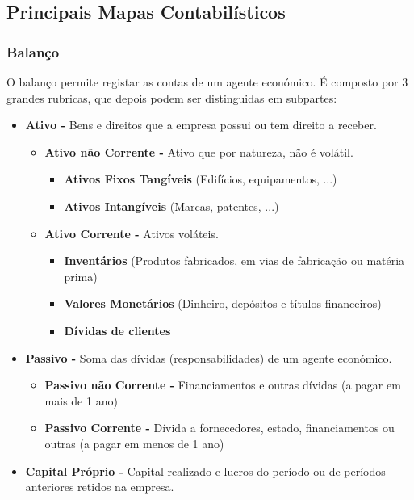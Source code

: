\documentclass[11pt]{article}
\begin{document}
\subsection{Principais Mapas Contabilísticos}

\subsubsection{Balanço}

O balanço permite registar as contas de um agente económico. É composto por 3 grandes rubricas, que depois podem ser distinguidas em subpartes:

\begin{itemize}
    \item \textbf{Ativo -} Bens e direitos que a empresa possui ou tem direito a receber.
    \begin{itemize}
        \item \textbf{Ativo não Corrente -} Ativo que por natureza, não é volátil.
        \begin{itemize}
            \item \textbf{Ativos Fixos Tangíveis} (Edifícios, equipamentos, ...)
            \item \textbf{Ativos Intangíveis} (Marcas, patentes, ...)
        \end{itemize}
        \item \textbf{Ativo Corrente -} Ativos voláteis.
        \begin{itemize}
            \item \textbf{Inventários} (Produtos fabricados, em vias de fabricação ou matéria prima)
            \item \textbf{Valores Monetários} (Dinheiro, depósitos e títulos financeiros)
            \item \textbf{Dívidas de clientes}
        \end{itemize}
    \end{itemize}
    \item \textbf{Passivo -} Soma das dívidas (responsabilidades) de um agente económico.
    \begin{itemize}
        \item \textbf{Passivo não Corrente -} Financiamentos e outras dívidas (a pagar em mais de 1 ano)
        \item \textbf{Passivo Corrente -} Dívida a fornecedores, estado, financiamentos ou outras (a pagar em menos de 1 ano)
    \end{itemize}
    \item \textbf{Capital Próprio -} Capital realizado e lucros do período ou de períodos anteriores retidos na empresa.
\end{itemize}
\end{document}
